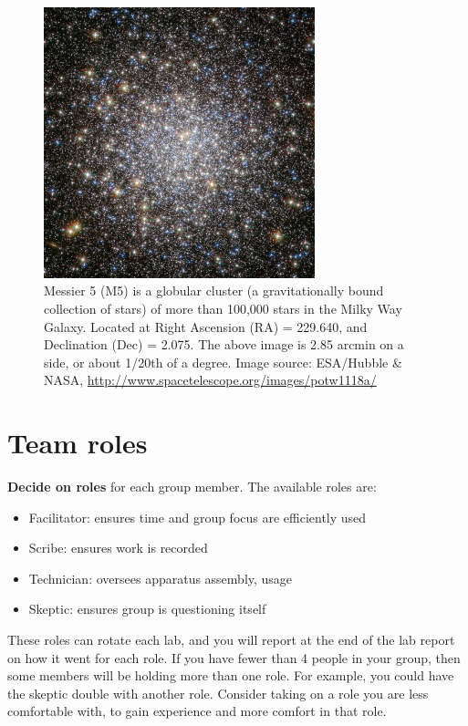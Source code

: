 \begin{figure}
	\centering
	\includegraphics[width=0.7\textwidth]{globular-cluster/potw1118a}
	\caption{Messier 5 (M5) is a globular cluster (a gravitationally bound collection
		of stars) of more than 100,000 stars in the Milky Way Galaxy. Located at Right
		Ascension (RA) = 229.640\textdegree, and Declination (Dec) = 2.075\textdegree.
		The above
		image is 2.85 arcmin on a side, or about 1/20th of a degree.
		Image source: ESA/Hubble \& NASA, \url{http://www.spacetelescope.org/images/potw1118a/}}\label{gc:fig:m5}
\end{figure}

\section{Team roles}

\textbf{Decide on roles} for each group member. The available roles are:

\begin{itemize}
	\item Facilitator: ensures time and group focus are efficiently used
	\item Scribe: ensures work is recorded
	\item Technician: oversees apparatus assembly, usage
	\item Skeptic: ensures group is questioning itself
\end{itemize}

These roles can rotate each lab, and you will report at the end of the lab report on how it went for each role. If you have fewer than 4 people in your group, then some members will be holding more than one role. For example, you could have the skeptic double with another role. Consider taking on a role you are less comfortable with, to gain experience and more comfort in that role.

